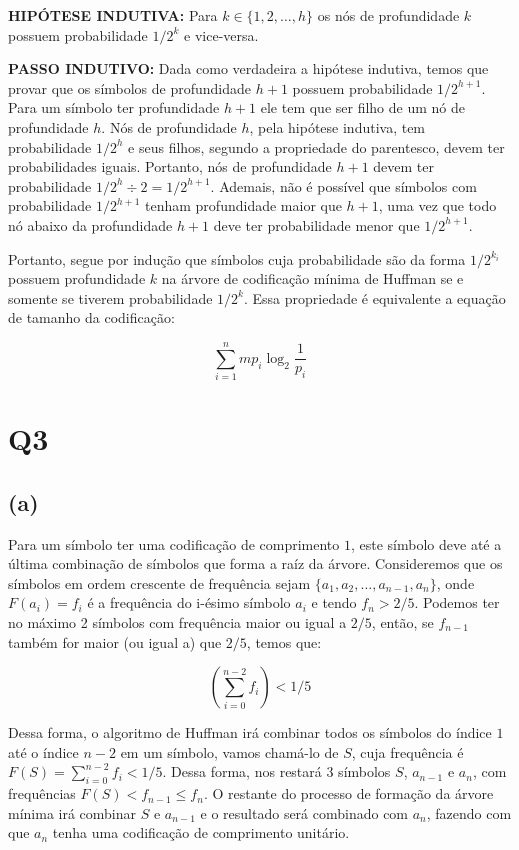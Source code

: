 \documentclass[12pt, a4paper]{article}
\begin{document}
\textbf{HIPÓTESE INDUTIVA:} Para $k \in \{1, 2, \ldots, h \}$ os nós de profundidade $k$ possuem probabilidade $1/2^k$ e vice-versa.

\textbf{PASSO INDUTIVO:} Dada como verdadeira a hipótese indutiva, temos que provar que os símbolos de profundidade $h+1$ possuem probabilidade $1/2^{h+1}$. Para um símbolo ter profundidade $h+1$ ele tem que ser filho de um nó de profundidade $h$. Nós de profundidade $h$, pela hipótese indutiva, tem probabilidade $1/2^h$ e seus filhos, segundo a propriedade do parentesco, devem ter probabilidades iguais. Portanto, nós de profundidade $h+1$ devem ter probabilidade $1/2^{h} \div 2 = 1/2^{h+1}$. Ademais, não é possível que símbolos com probabilidade $1/2^{h+1}$ tenham profundidade maior que $h+1$, uma vez que todo nó abaixo da profundidade $h+1$ deve ter probabilidade menor que $1/2^{h+1}$.

Portanto, segue por indução que símbolos cuja probabilidade são da forma $1/2^{k_i}$ possuem profundidade $k$ na árvore de codificação mínima de Huffman se e somente se tiverem probabilidade $1/2^k$. Essa propriedade é equivalente a equação de tamanho da codificação:

\[ \sum_{i=1}^{n} mp_i \log_{2}{\frac{1}{p_i}} \]


\section*{Q3}

\subsection*{(a)}

Para um símbolo ter uma codificação de comprimento $1$, este símbolo deve  até a última combinação de símbolos que forma a raíz da árvore. Consideremos que os símbolos em ordem crescente de frequência sejam $\{a_1, a_2, \ldots, a_{n-1}, a_n\}$, onde $F(a_i)=f_i$ é a frequência do i-ésimo símbolo $a_i$ e tendo $f_n > 2/5$. Podemos ter no máximo 2 símbolos com frequência maior ou igual a $2/5$, então, se $f_{n-1}$ também for maior (ou igual a) que $2/5$, temos que:

\[ \left( \sum_{i=0}^{n-2} f_i \right) < 1/5\]

Dessa forma, o algoritmo de Huffman irá combinar todos os símbolos do índice $1$ até o índice $n-2$ em um  símbolo, vamos chamá-lo de $S$, cuja frequência é $F(S) = \sum_{i=0}^{n-2} f_i < 1/5$. Dessa forma, nos restará 3 símbolos $S$, $a_{n-1}$ e $a_n$, com frequências $F(S) < f_{n-1} \leq f_n$. O restante do processo de formação da árvore mínima irá combinar $S$ e $a_{n-1}$ e o resultado será combinado com $a_n$, fazendo com que $a_n$ tenha uma codificação de comprimento unitário.
\end{document}
